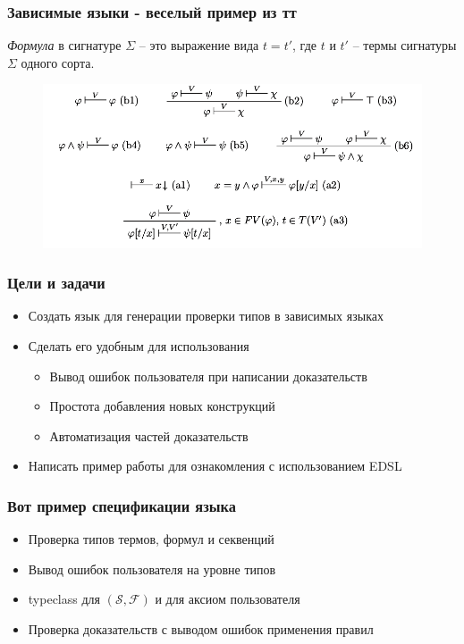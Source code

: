 \documentclass[14pt]{beamer}
\begin{document}
\begin{frame}
\frametitle{Зависимые языки - веселый пример из тт}
\emph{Формула} в сигнатуре $\Sigma$ -- это выражение вида $t = t'$, где $t$ и $t'$ -- термы сигнатуры $\Sigma$ одного сорта.

\begin{figure}[H]
  \center
  \includegraphics[width=1.0\linewidth]{vlai}
\end{figure}
\end{frame}

\begin{frame}
\frametitle{Цели и задачи}
\begin{itemize} %
  \item Создать язык для генерации проверки типов в зависимых языках
  \item Сделать его удобным для использования
  \begin{itemize}
    \item Вывод ошибок пользователя при написании доказательств
    \item Простота добавления новых конструкций
    \item Автоматизация частей доказательств
  \end{itemize}
  \item Написать пример работы для ознакомления с использованием EDSL
\end{itemize}
\end{frame}

\begin{frame}
\frametitle{Вот пример спецификации языка}
\begin{itemize} %
  \item Проверка типов термов, формул и секвенций
  \item Вывод ошибок пользователя на уровне типов
  \item typeclass для $(\mathcal{S},\mathcal{F})$ и для аксиом пользователя
  \item Проверка доказательств с выводом ошибок применения правил
\end{itemize}
\end{frame}
\end{document}
